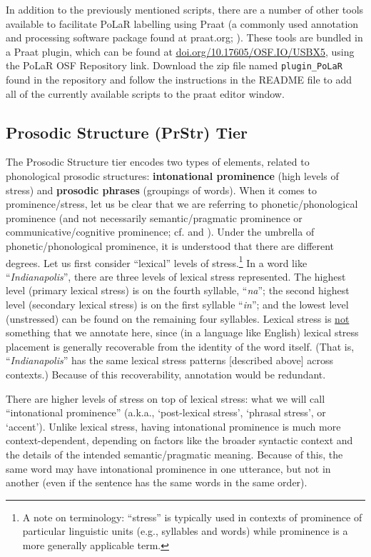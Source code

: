 \documentclass[11pt, twoside]{memoir}
\def\langtext#1{\textit{#1}}
\begin{document}
In addition to the previously mentioned scripts, there are a number of other tools available to facilitate PoLaR labelling using Praat (a commonly used annotation and processing software package found at praat.org; \citealt{praat}). These tools are bundled in a Praat plugin, which can be found at \href{https://doi.org/10.17605/OSF.IO/USBX5}{\uline{doi.org/10.17605/OSF.IO/USBX5}}, using the PoLaR OSF Repository link. Download the zip file named \texttt{plugin\_PoLaR} found in the repository and follow the instructions in the README file to add all of the currently available scripts to the praat editor window.

\subsection{Prosodic Structure (PrStr) Tier}\label{sec:prosodic-structure-prstr}

The Prosodic Structure tier encodes two types of elements, related to phonological prosodic structures: \textbf{intonational prominence} (high levels of stress) and \textbf{prosodic phrases} (groupings of words). When it comes to prominence\slash stress, let us be clear that we are referring to phonetic\slash phonological prominence (and not necessarily semantic\slash pragmatic prominence or communicative\slash cognitive prominence; cf. \citealt{gussenhoven15} and \citealt{wagner-15}). Under the umbrella of phonetic\slash phonological prominence, it is understood that there are different degrees. Let us first consider “lexical” levels of stress.\footnote{A note on terminology: “stress” is typically used in contexts of prominence of particular linguistic units (e.g., syllables and words) while prominence is a more generally applicable term.} In a word like “\langtext{Indianapolis}”, there are three levels of lexical stress represented. The highest level (primary lexical stress) is on the fourth syllable, “\langtext{na}”; the second highest level (secondary lexical stress) is on the first syllable “\langtext{in}”; and the lowest level (unstressed) can be found on the remaining four syllables. Lexical stress is \uline{not} something that we annotate here, since (in a language like English) lexical stress placement is generally recoverable from the identity of the word itself. (That is, “\langtext{Indianapolis}” has the same lexical stress patterns [described above] across contexts.) Because of this recoverability, annotation would be redundant.

There are higher levels of stress on top of lexical stress: what we will call “intonational prominence” (a.k.a., ‘post-lexical stress’, ‘phrasal stress’, or ‘accent’). Unlike lexical stress, having intonational prominence is much more context-dependent, depending on factors like the broader syntactic context and the details of the intended semantic\slash pragmatic meaning. Because of this, the same word may have intonational prominence in one utterance, but not in another (even if the sentence has the same words in the same order).
\end{document}

